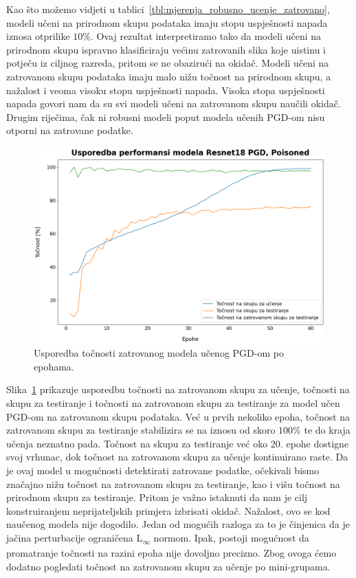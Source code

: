 \documentclass[times, utf8, zavrsni, numeric]{fer}
\begin{document}
\pagebreak

Kao što možemo vidjeti u tablici~\ref{tbl:mjerenja_robusno_ucenje_zatrovano}, modeli učeni na prirodnom skupu podataka imaju stopu uspješnosti napada iznosa otprilike $10\%$.
Ovaj rezultat interpretiramo tako da modeli učeni na prirodnom skupu ispravno klasificiraju većinu zatrovanih slika koje uistinu i potječu iz ciljnog razreda, pritom se ne obazirući na okidač.
Modeli učeni na zatrovanom skupu podataka imaju malo nižu točnost na prirodnom skupu, a nažalost i veoma visoku stopu uspješnosti napada. 
Visoka stopa uspješnosti napada govori nam da su svi modeli učeni na zatrovanom skupu naučili okidač. 
Drugim riječima, čak ni robusni modeli poput modela učenih PGD-om nisu otporni na zatrovane podatke.

\begin{figure}[htb]
    \centering
    \includegraphics[scale=0.41]{../stats/resnet18_poisoned_pgd_epochs_60_lr_0.1/stats_comparison.png}
    \caption{Usporedba točnosti zatrovanog modela učenog PGD-om po epohama.}
    \label{fig:pgd_poisoned_acc}
\end{figure}

\pagebreak

Slika~\ref{fig:pgd_poisoned_acc} prikazuje usporedbu točnosti na zatrovanom skupu za učenje, točnosti na skupu za testiranje i točnosti na zatrovanom skupu za testiranje 
za model učen PGD-om na zatrovanom skupu podataka. Već u prvih nekoliko epoha, točnost na zatrovanom skupu za testiranje stabilizira se na iznosu od skoro $100\%$ te do kraja učenja neznatno pada.
Točnost na skupu za testiranje već oko 20. epohe dostigne svoj vrhunac, dok točnost na zatrovanom skupu za učenje kontinuirano raste. Da je ovaj model u mogućnosti detektirati zatrovane podatke,
očekivali bismo značajno nižu točnost na zatrovanom skupu za testiranje, kao i višu točnost na prirodnom skupu za testiranje. 
Pritom je važno istaknuti da nam je cilj konstruiranjem neprijateljskih primjera izbrisati okidač. Nažalost, ovo se kod naučenog modela nije dogodilo.
Jedan od mogućih razloga za to je činjenica da je jačina perturbacije ograničena L\textsubscript{$\infty$} normom.
Ipak, postoji mogućnost da promatranje točnosti na razini epoha nije dovoljno precizno. Zbog ovoga ćemo dodatno pogledati točnost na zatrovanom skupu za učenje po mini-grupama.
\end{document}
